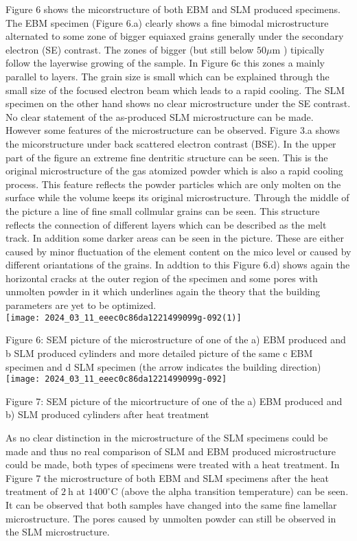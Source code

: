\documentclass[10pt]{article}
\begin{document}
Figure 6 shows the micorstructure of both EBM and SLM produced specimens. The EBM specimen (Figure 6.a) clearly shows a fine bimodal microstructure alternated to some zone of bigger equiaxed grains generally under the secondary electron (SE) contrast. The zones of bigger (but still below $50 \mu \mathrm{m}$ ) tipically follow the layerwise growing of the sample. In Figure $6 \mathrm{c}$ this zones a mainly parallel to layers. The grain size is small which can be explained through the small size of the focused electron beam which leads to a rapid cooling. The SLM specimen on the other hand shows no clear microstructure under the SE contrast. No clear statement of the as-produced SLM microstructure can be made. However some features of the microstructure can be observed. Figure 3.a shows the micorstructure under back scattered electron contrast (BSE). In the upper part of the figure an extreme fine dentritic structure can be seen. This is the original microstructure of the gas atomized powder which is also a rapid cooling process. This feature reflects the powder particles which are only molten on the surface while the volume keeps its original microstructure. Through the middle of the picture a line of fine small collmular grains can be seen. This structure reflects the connection of different layers which can be described as the melt track. In addition some darker areas can be seen in the picture. These are either caused by minor fluctuation of the element content on the mico level or caused by different oriantations of the grains. In addtion to this Figure 6.d) shows again the horizontal cracks at the outer region of the specimen and some pores with unmolten powder in it which underlines again the theory that the building parameters are yet to be optimized.\\
\texttt{[image: 2024\_03\_11\_eeec0c86da1221499099g-092(1)]}

Figure 6: SEM picture of the microstructure of one of the a) EBM produced and b SLM produced cylinders and more detailed picture of the same c EBM specimen and d SLM specimen (the arrow indicates the building direction)\\
\texttt{[image: 2024\_03\_11\_eeec0c86da1221499099g-092]}

Figure 7: SEM picture of the micortructure of one of the a) EBM produced and b) SLM produced cylinders after heat treatment

As no clear distinction in the microstructure of the SLM specimens could be made and thus no real comparison of SLM and EBM produced microstructure could be made, both types of specimens were treated with a heat treatment. In Figure 7 the microstructure of both EBM and SLM specimens after the heat treatment of $2 \mathrm{~h}$ at $1400^{\circ} \mathrm{C}$ (above the alpha transition temperature) can be seen. It can be observed that both samples have changed into the same fine lamellar microstructure. The pores caused by unmolten powder can still be observed in the SLM microstructure.
\end{document}
